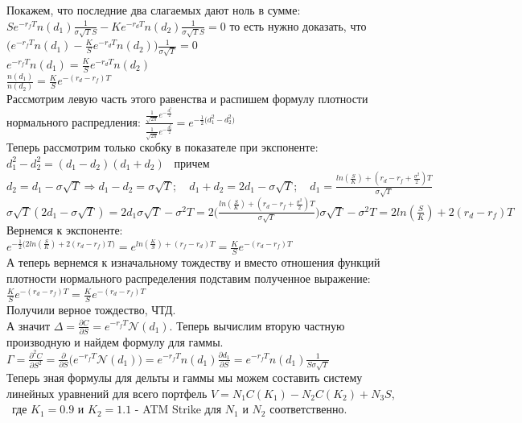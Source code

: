 \documentclass[a4paper]{article}
\theoremstyle{definition}
\begin{document}
    Покажем, что последние два слагаемых дают ноль в сумме: $S e^{-r_f T}n(d_1)\frac{1}{\sigma \sqrt{T} S} - K e^{-r_d T}n(d_2)\frac{1}{\sigma \sqrt{T} S} = 0$ 
    то есть нужно доказать, что $\big(e^{-r_f T}n(d_1) - \frac{K}{S} e^{-r_d T}n(d_2)\big) \frac{1}{\sigma \sqrt{T}} = 0$ \\
    $e^{-r_f T} n(d_1) = \frac{K}{S} e^{-r_d T} n(d_2) $ \\
    $\frac{n(d_1)}{n(d_2)} = \frac{K}{S} e^{-(r_d - r_f)T} $ \\
    Рассмотрим левую часть этого равенства и распишем формулу плотности нормального распредления: $\frac{\frac{1}{\sqrt{2\pi}} e^{-\frac{d_1^2}{2}}}{\frac{1}{\sqrt{2\pi}} e^{-\frac{d_2^2}{2}}} = 
    e^{-\frac{1}{2}\big( d_1^2 - d_2^2 \big)}$ \\ 
    Теперь рассмотрим только скобку в показателе при экспоненте: $ d_1^2 - d_2^2 = (d_1 - d_2)(d_1 + d_2)$ \ причем $d_2 = d_1 - \sigma\sqrt{T} 
    \Rightarrow d_1 - d_2 = \sigma\sqrt{T}; \quad d_1 + d_2 = 2d_1 - \sigma\sqrt{T}; \quad d_1 = \frac{ln(\frac{S}{K}) + (r_d - r_f + \frac{\sigma^2}{2})T}{\sigma\sqrt{T}}$ \\
    $ \sigma\sqrt{T}(2d_1 - \sigma\sqrt{T}) = 2d_1 \sigma\sqrt{T} - \sigma^2 T = 2 \big( \frac{ln(\frac{S}{K}) + (r_d - r_f + \frac{\sigma^2}{2})T}{\sigma\sqrt{T}} \big) \sigma \sqrt{T} - \sigma^2 T = 
    2ln(\frac{S}{K}) + 2(r_d - r_f)T$ \\
    Вернемся к экспоненте: $ e^{-\frac{1}{2}\big( 2ln(\frac{S}{K}) + 2(r_d - r_f)T \big)} = e^{ ln(\frac{K}{S}) + (r_f - r_d)T} = \frac{K}{S} e^{- (r_d - r_f)T} $ \\
    А теперь вернемся к изначальному тождеству и вместо отношения функций плотности нормального распределения подставим полученное выражение: 
    $ \frac{K}{S} e^{-(r_d - r_f)T} = \frac{K}{S} e^{-(r_d - r_f)T}$ \\ Получили верное тождество, ЧТД. \\
    
    А значит $\Delta = \frac{\partial C}{\partial S} = e^{-r_f T}\mathcal{N}(d_1)$. Теперь вычислим вторую частную производную и найдем формулу для гаммы.
    $\Gamma = \frac{\partial^2 C}{\partial S^2} = \frac{\partial}{\partial S} \big( e^{-r_f T}\mathcal{N}(d_1) \big) = e^{-r_f T}n(d_1) \frac{\partial d_1}{\partial S} = 
    e^{-r_f T} n(d_1) \frac{1}{S\sigma\sqrt{T}}$ \\
    
    Теперь зная формулы для дельты и гаммы мы можем составить систему линейных уравнений для всего портфель $V = N_1 C(K_1) - N_2 C(K_2) + N_3 S$, \ где $K_1 = 0.9 $ и $K_2 = 1.1$ - ATM Strike для $N_1$ и $N_2$ соответственно.
\end{document}
